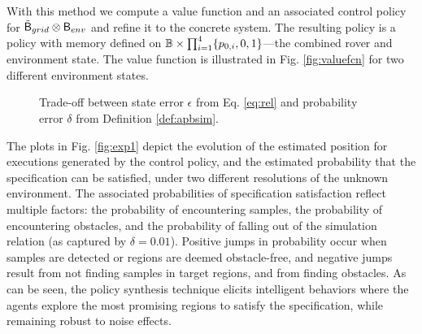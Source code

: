 \documentclass{ifacconf}
\newcommand{\red}[1]{{\color{red} #1}}
\begin{document}
With this method we compute a value function and an associated control policy for $\tilde {\mathsf{B}}_{grid} \otimes \mathsf{B}_{env}$ and refine it to the concrete system.  \red{The resulting policy is a policy with memory defined on $\mathbb{B} \times \prod_{i=1}^4 \{ p_{0,i}, 0, 1 \}$---the combined rover and environment state. }The value function is illustrated in Fig. \ref{fig:valuefcn} for two different environment states.

\begin{figure}
  \footnotesize
  
  \caption{Trade-off between state error $\epsilon$ from Eq. \eqref{eq:rel} and probability error $\delta$ from Definition \ref{def:apbsim}.}
  \label{fig:tradeoff}
\end{figure}

The plots in Fig. \ref{fig:exp1} depict the evolution of the estimated position for executions generated by the control policy, and the estimated probability that the specification can be satisfied, under two different resolutions of the unknown environment. The associated probabilities of specification satisfaction reflect multiple factors: the probability of encountering samples, the probability of encountering obstacles, and the probability of falling out of the simulation relation (as captured by $\delta = 0.01$). Positive jumps in probability occur when samples are detected or regions are deemed obstacle-free, and negative jumps result from not finding samples in target regions, and from finding obstacles. As can be seen, the policy synthesis technique elicits intelligent behaviors where the agents explore the most promising regions to satisfy the specification, while remaining robust to noise effects.
\end{document}
